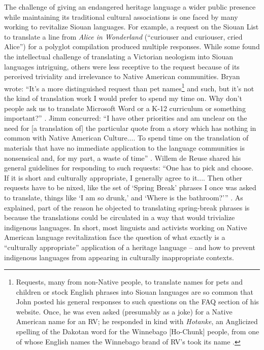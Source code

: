 \documentclass[output=paper]{LSP/langsci}
\begin{document}
The challenge of giving an endangered heritage language a wider public presence while maintaining its traditional cultural associations is one faced by many working to revitalize Siouan languages. For example, a request on the Siouan List to translate a line from \emph{Alice in Wonderland} (``curiouser and curiouser, cried Alice'') for a polyglot compilation produced multiple responses. While some found the intellectual challenge of translating a Victorian neologism into Siouan languages intriguing, others were less receptive to the request because of its perceived triviality and irrelevance to Native American communities. Bryan wrote: ``It's a more distinguished request than pet names\footnote{Requests, many from non-Native people, to translate names for pets and children or stock English phrases into Siouan languages are so common that John \citet{Koontz2003a} posted his general responses to such questions on the FAQ section of his website. Once, he was even asked (presumably as a joke) for a Native American name for an RV; he responded in kind with \emph{Hotanke}, an Anglicized spelling of the Dakotan word for the Winnebago [Ho-Chunk] people, from one of whose English names the Winnebago brand of RV's took its name \citep{Koontz2003b}.} and such, but it's not the kind of translation work I would prefer to spend my time on. Why don't people ask us to translate Microsoft Word or a K-12 curriculum or something important?'' \citep{Gordon2014}. Jimm concurred: ``I have other priorities and am unclear on the need for [a translation of] the particular quote from a story which has nothing in common with Native American Culture.... To spend time on the translation of materials that have no immediate application to the language communities is nonsensical and, for my part, a waste of time'' \citep{Goodtracks2014}. Willem de Reuse shared his general guidelines for responding to such requests: ``One has to pick and choose. If it is short and culturally appropriate, I generally agree to it.... Then other requests have to be nixed, like the set of `Spring Break' phrases I once was asked to translate, things like `I am so drunk,' and `Where is the bathroom?'\thinspace'' \citep{deReuse2014a}. As \citet{deReuse2014b} explained, part of the reason he objected to translating spring-break phrases is because the translations could be circulated in a way that would trivialize indigenous languages. In short, most linguists and activists working on Native American language revitalization face the question of what exactly is a ``culturally appropriate'' application of a heritage language -- and how to prevent indigenous languages from appearing in culturally inappropriate contexts.
\end{document}
